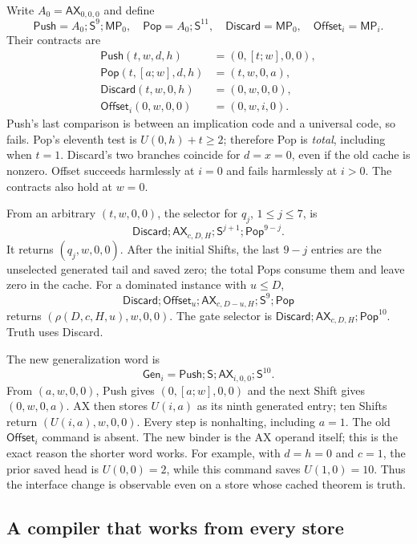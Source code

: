 Write $A_0=\mathsf{AX}_{0,0,0}$ and define
\[
 \mathsf{Push}=A_0;\mathsf S^9;\mathsf{MP}_0,\quad
 \mathsf{Pop}=A_0;\mathsf S^{11},\quad
 \mathsf{Discard}=\mathsf{MP}_0,\quad
 \mathsf{Offset}_i=\mathsf{MP}_i.
\]
Their contracts are
\begin{align*}
 \mathsf{Push}(t,w,d,h)&=(0,[t;w],0,0),\\
 \mathsf{Pop}(t,[a;w],d,h)&=(t,w,0,a),\\
 \mathsf{Discard}(t,w,0,h)&=(0,w,0,0),\\
 \mathsf{Offset}_i(0,w,0,0)&=(0,w,i,0).
\end{align*}
Push's last comparison is between an implication code and a universal
code, so fails. Pop's eleventh test is $U(0,h)+t\ge2$; therefore Pop is
\emph{total}, including when $t=1$. Discard's two branches coincide for
$d=x=0$, even if the old cache is nonzero. Offset succeeds harmlessly at
$i=0$ and fails harmlessly at $i>0$. The contracts also hold at $w=0$.

From an arbitrary $(t,w,0,0)$, the selector for $q_j$, $1\le j\le7$, is
\[
 \mathsf{Discard};\mathsf{AX}_{c,D,H};\mathsf S^{j+1};
                  \mathsf{Pop}^{9-j}.
\]
It returns $(q_j,w,0,0)$. After the initial Shifts, the last $9-j$ entries
are the unselected generated tail and saved zero; the total Pops consume
them and leave zero in the cache. For a dominated instance with $u\le D$,
\[
 \mathsf{Discard};\mathsf{Offset}_u;
 \mathsf{AX}_{c,D-u,H};\mathsf S^9;\mathsf{Pop}
\]
returns $(\rho(D,c,H,u),w,0,0)$. The gate selector is
$\mathsf{Discard};\mathsf{AX}_{c,D,H};\mathsf{Pop}^{10}$.
Truth uses Discard.

The new generalization word is
\begin{equation}\label{eq:g-gen}
 \mathsf{Gen}_i=\mathsf{Push};\mathsf S;
                       \mathsf{AX}_{i,0,0};\mathsf S^{10}.
\end{equation}
From $(a,w,0,0)$, Push gives $(0,[a;w],0,0)$ and the next Shift gives
$(0,w,0,a)$. AX then stores $U(i,a)$ as its ninth generated entry; ten
Shifts return $(U(i,a),w,0,0)$. Every step is nonhalting, including $a=1$.
The old $\mathsf{Offset}_i$ command is absent. The new binder is the AX
operand itself; this is the exact reason the shorter word works.
For example, with $d=h=0$ and $c=1$, the prior saved head is
$U(0,0)=2$, while this command saves $U(1,0)=10$. Thus the interface
change is observable even on a store whose cached theorem is truth.

\subsection{A compiler that works from every store}

